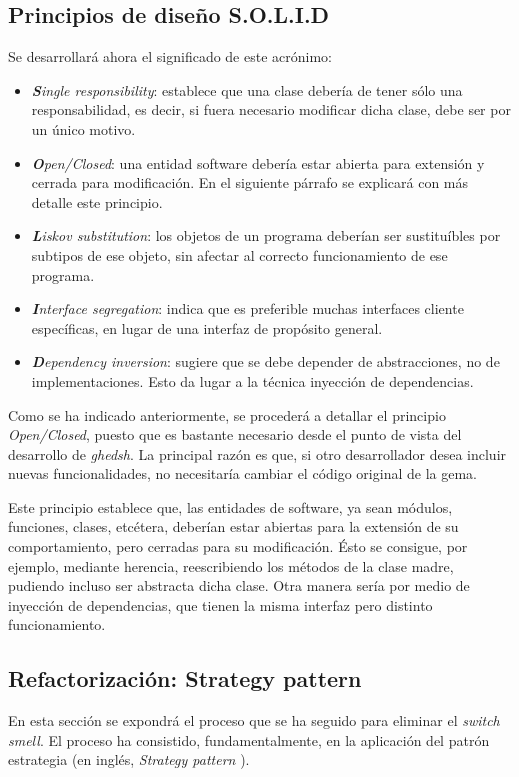 \subsection{Principios de diseño S.O.L.I.D}
\label{2.2.1}
Se desarrollará ahora el significado de este acrónimo:
\begin{itemize}
  \item {\it \textbf{S}ingle responsibility}: establece que una clase debería de tener sólo una responsabilidad, es decir, si fuera necesario modificar dicha clase, debe ser por un único motivo.
  \item {\it \textbf{O}pen/Closed}: una entidad software debería estar abierta para extensión y cerrada para modificación. En el siguiente párrafo se explicará con más detalle este principio.
  \item {\it \textbf{L}iskov substitution}: los objetos de un programa deberían ser sustituíbles por subtipos de ese objeto, sin afectar al correcto funcionamiento de ese programa.
  \item {\it \textbf{I}nterface segregation}: indica que es preferible muchas interfaces cliente específicas, en lugar de una interfaz de propósito general.
  \item {\it \textbf{D}ependency inversion}: sugiere que se debe depender de abstracciones, no de implementaciones. Esto da lugar a la técnica inyección de dependencias.
\end{itemize}
\bigskip

Como se ha indicado anteriormente, se procederá a detallar el principio {\it Open/Closed}, puesto que es bastante necesario desde el punto de vista del desarrollo de {\it ghedsh}. La principal razón es que, si otro desarrollador desea incluir nuevas funcionalidades, no necesitaría cambiar el código original de la gema.
\bigskip

Este principio establece que, las entidades de software, ya sean módulos, funciones, clases, etcétera, deberían estar abiertas para la extensión de su comportamiento, pero cerradas para su modificación. Ésto se consigue, por ejemplo, mediante herencia, reescribiendo los métodos de la clase madre, pudiendo incluso ser abstracta dicha clase.
Otra manera sería por medio de inyección de dependencias, que tienen la misma interfaz pero distinto funcionamiento.

\subsection{Refactorización: Strategy pattern}
\label{2.2.2}
En esta sección se expondrá el proceso que se ha seguido para eliminar el {\it switch smell}. El proceso ha consistido, fundamentalmente,
en la aplicación del patrón estrategia (en inglés, {\it Strategy pattern} \cite{jspatterns:2012}).
\bigskip

